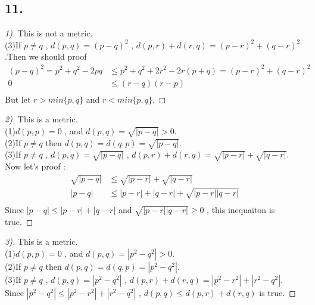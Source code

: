 \documentclass{report}
\begin{document}
            \subsection*{11.}
                \begin{proof}[1)]
                    This is not a metric.\\
                    (3)If $p \not = q$ , $d(p,q)=(p-q)^2$ , $d(p,r)+d(r,q)=(p-r)^2+(q-r)^2$.Then we should proof
                    \begin{align*}
                        (p-q)^2=p^2+q^2-2pq &\le p^2+q^2+2r^2-2r(p+q)=(p-r)^2+(q-r)^2\\
                                         0  &\le (r-q)(r-p)\\
                    \end{align*}
                    But let $r > min\{p,q\}$ and $r< min\{p,q\}$.
                \end{proof}
                \begin{proof}[2)]
                    This is a metric.\\
                    (1)$d(p,p)=0$ , and $d(p,q)=\sqrt{|p-q|}>0$.\\
                    (2)If $p \not = q$ then $d(p,q)=d(q,p)=\sqrt{|p-q|}$.\\
                    (3)If $p \not = q$ , $d(p,q)=\sqrt{|p-q|}$ , $d(p,r)+d(r,q) =\sqrt{|p-r|}+\sqrt{|q-r|}$.\\
                    Now let's proof :
                    \begin{align*}
                        \sqrt{|p-q|} &\le \sqrt{|p-r|}+\sqrt{|q-r|}\\
                        |p-q|  &\le |p-r|+|q-r|+\sqrt{|p-r||q-r|}\\
                    \end{align*}
                    Since $|p-q|  \le |p-r|+|q-r|$ and $\sqrt{|p-r||q-r|} \ge 0$ , this inequaiton is true.
                \end{proof}
                \begin{proof}[3)]
                    This is a metric.\\
                    (1)$d(p,p)=0$ , and $d(p,q)=|p^2-q^2|>0$.\\
                    (2)If $p \not = q$ then $d(p,q)=d(q,p)=|p^2-q^2|$.\\
                    (3)If $p \not = q$ , $d(p,q)=|p^2-q^2|$ , $d(p,r)+d(r,q) =|p^2-r^2|+|r^2-q^2|$.\\
                    Since $|p^2-q^2|  \le |p^2-r^2|+|r^2-q^2|$ , $d(p,q) \le d(p,r)+d(r,q)$ is true.
                \end{proof}
\end{document}
